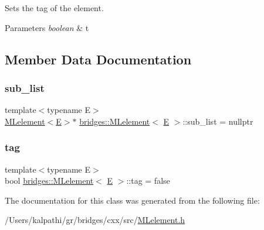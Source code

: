 Sets the tag of the element.


\begin{DoxyParams}{Parameters}
{\em boolean} & t \\
\hline
\end{DoxyParams}


\subsection{Member Data Documentation}
\mbox{\label{classbridges_1_1_m_lelement_aa664b4e694c08e5cc31cc9d317dda100}} 
\subsubsection{\texorpdfstring{sub\_list}{sub\_list}}
{\footnotesize\ttfamily template$<$typename E$>$ \\
\mbox{\hyperlink{classbridges_1_1_m_lelement}{M\+Lelement}}$<$\mbox{\hyperlink{namespacebridges_acfb0a4f7877d8f63de3e6862004c50eda3a3ea00cfc35332cedf6e5e9a32e94da}{E}}$>$$\ast$ \mbox{\hyperlink{classbridges_1_1_m_lelement}{bridges\+::\+M\+Lelement}}$<$ \mbox{\hyperlink{namespacebridges_acfb0a4f7877d8f63de3e6862004c50eda3a3ea00cfc35332cedf6e5e9a32e94da}{E}} $>$\+::sub\+\_\+list = nullptr\hspace{0.3cm}{\ttfamily [protected]}}

\mbox{\label{classbridges_1_1_m_lelement_a0285a07355b2bc3d064c30e20aa2fd55}} 
\subsubsection{\texorpdfstring{tag}{tag}}
{\footnotesize\ttfamily template$<$typename E$>$ \\
bool \mbox{\hyperlink{classbridges_1_1_m_lelement}{bridges\+::\+M\+Lelement}}$<$ \mbox{\hyperlink{namespacebridges_acfb0a4f7877d8f63de3e6862004c50eda3a3ea00cfc35332cedf6e5e9a32e94da}{E}} $>$\+::tag = false\hspace{0.3cm}{\ttfamily [protected]}}



The documentation for this class was generated from the following file\+:\begin{DoxyCompactItemize}
\item 
/\+Users/kalpathi/gr/bridges/cxx/src/\mbox{\hyperlink{_m_lelement_8h}{M\+Lelement.\+h}}\end{DoxyCompactItemize}
